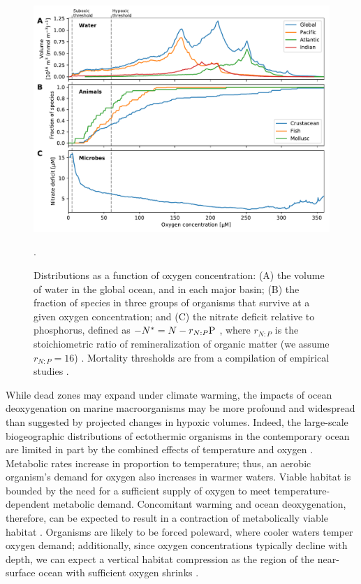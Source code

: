 \documentclass[draft,linenumbers]{report_chapter}
\begin{document}
\begin{figure}[p!]
\centering
\includegraphics[width=\textwidth]{woa_o2pdf_mortality_no3deficit.pdf}
\caption{Distributions as a function of oxygen concentration:
(A) the volume of water in the global ocean, and in each major basin; (B) the fraction of species in three groups of organisms that survive at a given oxygen concentration; and (C) the nitrate deficit relative to phosphorus, defined as ${-N^* = N - r_{N:P}\ce{P}}$ \protect\citep{Gruber-Sarmiento-1997}, where ${r_{N:P}}$ is the stoichiometric ratio of remineralization of organic matter (we assume ${r_{N:P} = 16}$) \protect\citep{Anderson-Sarmiento-1994}.  Mortality thresholds are from a compilation of empirical studies \citep{Vaquer-Sunyer-Duarte-2008}.}.
\label{fig:o2pdfs}
\end{figure}

While dead zones may expand under climate warming, the impacts of ocean deoxygenation on marine macroorganisms may be more profound and widespread than suggested by projected changes in hypoxic volumes.
Indeed, the large-scale biogeographic distributions of ectothermic organisms in the contemporary ocean are limited in part by the combined effects of temperature and oxygen \citep{Deutsch-Ferrel-etal-2015}.
Metabolic rates increase in proportion to temperature; thus, an aerobic organism's demand for oxygen also increases in warmer waters.
Viable habitat is bounded by the need for a sufficient supply of oxygen to meet temperature-dependent metabolic demand.
Concomitant warming and ocean deoxygenation, therefore, can be expected to result in a contraction of metabolically viable habitat \citep{Deutsch-Ferrel-etal-2015}.
Organisms are likely to be forced poleward, where cooler waters temper oxygen demand; additionally, since oxygen concentrations typically decline with depth, we can expect a vertical habitat compression as the region of the near-surface ocean with sufficient oxygen shrinks \citep{Koslow-Goericke-etal-2011}.
\end{document}
